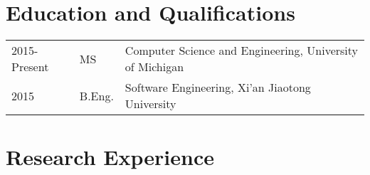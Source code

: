 \documentclass[a4paper,11pt]{article}
\begin{document}
\maketitle

\section{Education and Qualifications}

\begin{tabular}{lll}
    2015-Present   & MS   & Computer Science and Engineering, University of Michigan \\
    2015               & B.Eng. & Software Engineering, Xi'an Jiaotong University
\end{tabular}

\section{Research Experience}
\end{document}
